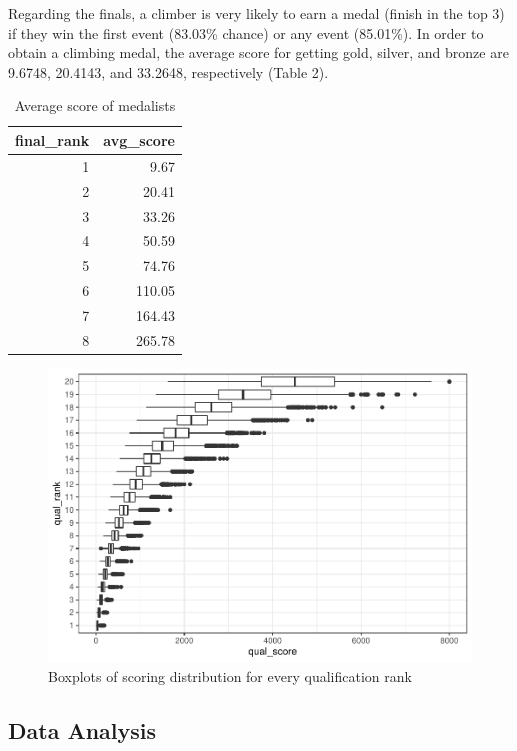 \documentclass[12pt]{article}
\begin{document}
Regarding the finals, a climber is very likely to earn a medal (finish
in the top 3) if they win the first event (83.03\% chance) or any event
(85.01\%). In order to obtain a climbing medal, the average score for
getting gold, silver, and bronze are 9.6748, 20.4143, and 33.2648,
respectively (Table 2).

\begin{table}[ht]
\centering
\caption{Average score of medalists} 
\begin{tabular}{rr}
  \hline
final\_rank & avg\_score \\ 
  \hline
  1 & 9.67 \\ 
    2 & 20.41 \\ 
    3 & 33.26 \\ 
    4 & 50.59 \\ 
    5 & 74.76 \\ 
    6 & 110.05 \\ 
    7 & 164.43 \\ 
    8 & 265.78 \\ 
   \hline
\end{tabular}
\end{table}

\begin{figure}
\centering
\includegraphics{draft_files/figure-latex/unnamed-chunk-7-1.pdf}
\caption{Boxplots of scoring distribution for every qualification rank}
\end{figure}

\hypertarget{data-analysis}{%
\subsection{Data Analysis}\label{data-analysis}}
\end{document}
